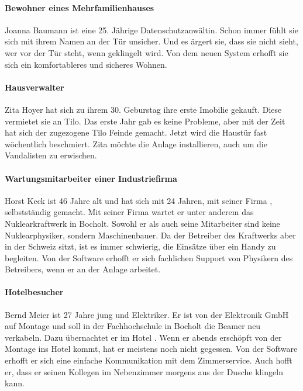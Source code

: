 \paragraph{\large{Bewohner eines Mehrfamilienhauses}}
    Joanna Baumann ist eine 25. Jährige Datenschutzanwältin.
    Schon immer fühlt sie sich mit ihrem Namen an der Tür unsicher.
    Und es ärgert sie, dass sie nicht sieht, wer vor der Tür steht, wenn geklingelt wird.
    Von dem neuen System erhofft sie sich ein komfortableres und sicheres Wohnen.


\paragraph{\large{Hausverwalter}}
    Zita Hoyer hat sich zu ihrem 30. Geburstag ihre erste Imobilie gekauft.
    Diese vermietet sie an Tilo.
    Das erste Jahr gab es keine Probleme, aber mit der Zeit hat sich der zugezogene Tilo Feinde gemacht.
    Jetzt wird die Haustür fast wöchentlich beschmiert.
    Zita möchte die Anlage installieren, auch um die Vandalisten zu erwischen.


\paragraph{\large{Wartungsmitarbeiter einer Industriefirma}}
    Horst Keck ist 46 Jahre alt und hat sich mit 24 Jahren, mit seiner Firma , selbstständig gemacht.
    Mit seiner Firma wartet er unter anderem das Nuklearkraftwerk  in Bocholt.
    Sowohl er als auch seine Mitarbeiter sind keine Nuklearphysiker, sondern Maschinenbauer.
    Da der Betreiber des Kraftwerks aber in der Schweiz sitzt, ist es immer schwierig, die Einsätze über ein Handy zu begleiten.
    Von der Software erhofft er sich fachlichen Support von Physikern des Betreibers, wenn er an der Anlage arbeitet.


\paragraph{\large{Hotelbesucher}}
    Bernd Meier ist 27 Jahre jung und Elektriker.
    Er ist von der Elektronik GmbH auf Montage und soll in der Fachhochschule in Bocholt die Beamer neu verkabeln.
    Dazu übernachtet er im Hotel .
    Wenn er abends erschöpft von der Montage ins Hotel kommt, hat er meistens noch nicht gegessen.
    Von der Software erhofft er sich eine einfache Kommunikation mit dem Zimmerservice.
    Auch hofft er, dass er seinen Kollegen im Nebenzimmer morgens aus der Dusche klingeln kann.
